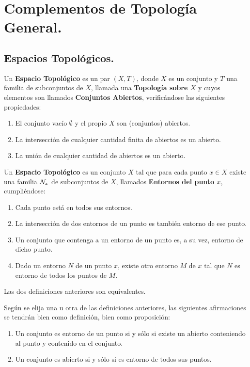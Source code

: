 \documentclass[cursovd_portada.tex]{subfiles}
\begin{document}
\chapter{Complementos de Topología\\ General.}
\section{Espacios Topológicos.}
\begin{defi}
Un {\bf Espacio Topológico} es un par $(X,T)$, donde $X$ es un conjunto y $T$ una familia de subconjuntos de $X$,
llamada una {\bf Topología sobre $X$} y cuyos elementos son llamados {\bf Conjuntos Abiertos}, verificándose las
siguientes propiedades:
\begin{enumerate}
\item El conjunto vacío $\emptyset$ y el propio $X$ son (conjuntos) abiertos.
\item La intersección de cualquier cantidad finita de abiertos es un abierto.
\item La unión de cualquier cantidad de abiertos es un abierto.
\end{enumerate}
\end{defi}
\begin{defi}
Un {\bf Espacio Topológico} es un conjunto $X$ tal que para cada punto $x\in X$ existe una familia ${\cal N}_x$ de
subconjuntos de $X$, llamados {\bf Entornos del punto $x$}, cumpliéndose:
\begin{enumerate}
\item Cada punto está en todos sus entornos.
\item La intersección de dos entornos de un punto es también entorno de ese punto.
\item Un conjunto que contenga a un entorno de un punto es, a su vez, entorno de dicho punto.
\item Dado un entorno $N$ de un punto $x$, existe otro entorno $M$ de $x$ tal que $N$ es entorno de todos los
puntos de $M$.
\end{enumerate}
\end{defi}
\begin{teorema}
Las dos definiciones anteriores son equivalentes.
\end{teorema}
\begin{nota}
Según se elija una u otra de las definiciones anteriores, las siguientes afirmaciones se tendrán bien como
definición, bien como proposición:
\begin{enumerate}
\item Un conjunto es entorno de un punto si y sólo si existe un abierto conteniendo al punto y contenido en el
conjunto.
\item Un conjunto es abierto si y sólo si es entorno de todos sus puntos.
\end{enumerate}
\end{nota}
\end{document}

